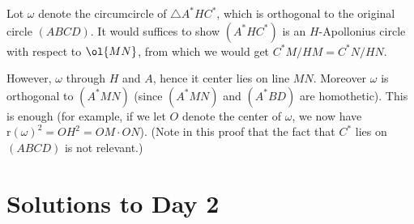 Lot $\omega$ denote the circumcircle of $\triangle A^\ast H C^\ast$,
which is orthogonal to the original circle $(ABCD)$.
It would suffices to show $(A^\ast H C^\ast)$
is an $H$-Apollonius circle with respect to $\ol{MN}$,
from which we would get $C^\ast M / H M = C^\ast N / H N$.

However, $\omega$ through $H$ and $A$,
hence it center lies on line $MN$.
Moreover $\omega$ is orthogonal to $(A^\ast MN)$
(since $(A^\ast MN)$ and $(A^\ast BD)$ are homothetic).
This is enough (for example, if we let $O$ denote the center of $\omega$,
we now have $\mathrm{r}(\omega)^2 = OH^2 = OM \cdot ON$).
(Note in this proof that the fact that $C^\ast$ lies on $(ABCD)$
is not relevant.)
\pagebreak

\section{Solutions to Day 2}